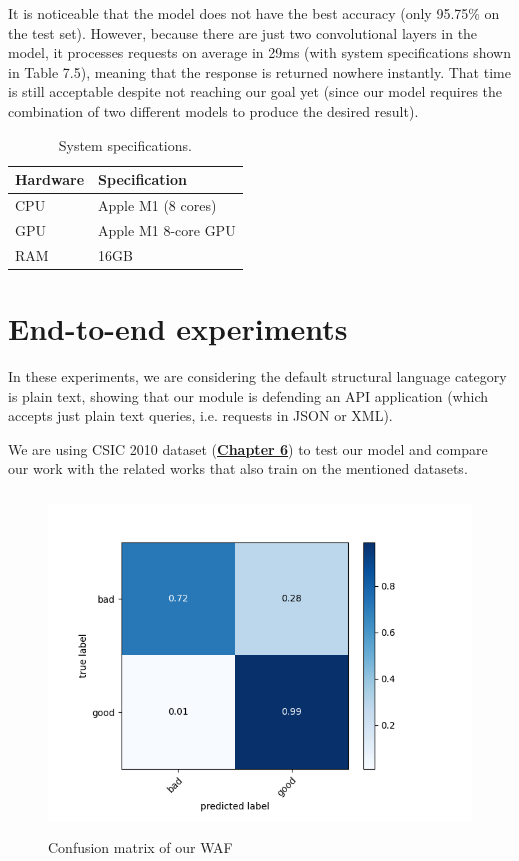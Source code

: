 It is noticeable that the model does not have the best accuracy (only 95.75\% on the test set). However, because there are just two convolutional layers in the model, it processes requests on average in 29ms (with system specifications shown in Table 7.5), meaning that the response is returned nowhere instantly. That time is still acceptable despite not reaching our goal yet (since our model requires the combination of two different models to produce the desired result).

\begin{table}[h!]
\centering
	\begin{tabular}{ll}
	\hline
	\textbf{Hardware} & \textbf{Specification} \\ \hline
	CPU               & Apple M1 (8 cores)     \\
	GPU               & Apple M1 8-core GPU    \\
	RAM               & 16GB                   \\ \hline
	\end{tabular}
	\caption{\label{demo-table} System specifications.}
\end{table}
  
\section{End-to-end experiments}
\hspace{0.5cm}In these experiments, we are considering the default structural language category is plain text, showing that our module is defending an API application (which accepts just plain text queries, i.e. requests in JSON or XML).

We are using CSIC 2010 dataset (\hyperref[subsec:csic_2010]{\textbf{Chapter 6}}) to test our model and compare our work with the related works that also train on the mentioned datasets.

\begin{figure}[h!]
	\centering
	\includegraphics[width=\linewidth, height=9cm,keepaspectratio]{figures/confusion 3.png}
	\caption{Confusion matrix of our WAF}
\end{figure}

